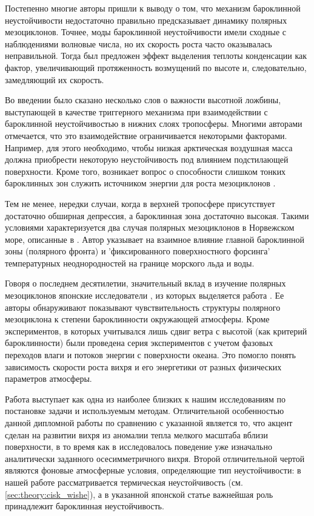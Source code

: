 Постепенно многие авторы пришли к выводу о том, что механизм бароклинной неустойчивости недостаточно правильно предсказывает динамику полярных мезоциклонов. Точнее, моды бароклинной неустойчивости имели сходные с наблюдениями волновые числа, но их скорость роста часто оказывалась неправильной. Тогда был предложен эффект выделения теплоты конденсации как фактор, увеличивающий протяженность возмущений по высоте и, следовательно, замедляющий их скорость.

Во введении было сказано несколько слов о важности высотной ложбины, выступающей в качестве триггерного механизма при взаимодействии с бароклинной неустойчивостью в нижних слоях тропосферы. Многими авторами отмечается, что это взаимодействие ограничивается некоторыми факторами. Например, для этого необходимо, чтобы низкая арктическая воздушная масса должна приобрести некоторую неустойчивость под влиянием подстилающей поверхности. Кроме того, возникает вопрос о способности слишком тонких бароклинных зон служить источником энергии для роста мезоциклонов \citep{AlbrightEtAl1995}.

Тем не менее, нередки случаи, когда в верхней тропосфере присутствует достаточно обширная депрессия, а бароклинная зона достаточно высокая. Такими условиями характеризуется два случая полярных мезоциклонов в Норвежском море, описанные в \citep{Nordeng1990}. Автор указывает на взаимное влияние главной бароклинной зоны (полярного фронта) и 'фиксированного поверхностного форсинга' температурных неоднородностей на границе морского льда и воды.

Говоря о последнем десятилетии, значительный вклад в изучение полярных мезоциклонов японские исследователи \citep{YanaseEtAl2004,YanaseNiino2004,Nagata1993}, из которых выделяется работа \citep{YanaseNiino2007}. Ее авторы обнаруживают показывают чувствительность структуры полярного мезоциклона к степени бароклинности окружающей атмосферы. Кроме экспериментов, в которых учитывался лишь сдвиг ветра с высотой (как критерий бароклинности) были проведена серия экспериментов с учетом фазовых переходов влаги и потоков энергии с поверхности океана. Это помогло понять зависимость скорости роста вихря и его энергетики от разных физических параметров атмосферы. 

Работа \citep{YanaseNiino2007} выступает как одна из наиболее близких к нашим исследованиям по постановке задачи и используемым методам. Отличительной особенностью данной дипломной работы по сравнению с указанной является то, что акцент сделан на развитии вихря из аномалии тепла мелкого масштаба вблизи поверхности, в то время как в \citep{YanaseNiino2007} исследовалось поведение уже изначально аналитически заданного осесимметричного вихря. Второй отличительной чертой являются фоновые атмосферные условия, определяющие тип неустойчивости: в нашей работе рассматривается термическая неустойчивость (см. \ref{sec:theory:cisk_wishe}), а в указанной японской статье важнейшая роль принадлежит бароклинная неустойчивость.

